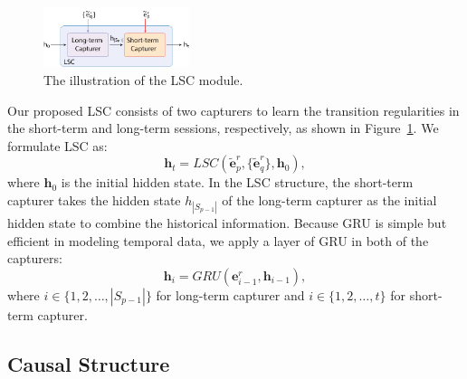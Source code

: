 \documentclass[sigconf]{acmart}
\begin{document}
    \begin{figure}[bt]
        \begin{center}
        \includegraphics[width=0.38\textwidth]{figure/module.pdf}
        \end{center}
        \caption{The illustration of the LSC module.}
        \label{fig:module}
        \vspace{-3mm}
    \end{figure}
    
    
    
    Our proposed LSC consists of two capturers to learn the transition regularities in the short-term and long-term sessions, respectively, as shown in Figure~\ref{fig:module}. We formulate LSC as:
    \begin{equation}
    \label{eq:lsc-1}
        \boldsymbol{h}_t = LSC(\widetilde{\boldsymbol{e}}^r_p, \{\widetilde{\boldsymbol{e}}^r_q\}, \boldsymbol{h}_{0}),
    \end{equation}
    where $\boldsymbol{h}_{0}$ is the initial hidden state. In the LSC structure, the short-term capturer takes the hidden state $h_{|S_{p-1}|}$ of the long-term capturer as the initial hidden state to combine the historical information. Because GRU is simple but efficient in modeling temporal data, we apply a layer of GRU in both of the capturers:
    \begin{equation}
    \label{eq:gru-1}
        \boldsymbol{h}_i = GRU(\boldsymbol{e}^r_{i-1}, \boldsymbol{h}_{i-1}),
    \end{equation}
    where $i\in\{1,2,\dots,|S_{p-1}|\}$ for long-term capturer and $i\in\{1,2,\dots,t\}$ for short-term capturer.
    
    
    
\subsection{Causal Structure}
\end{document}
